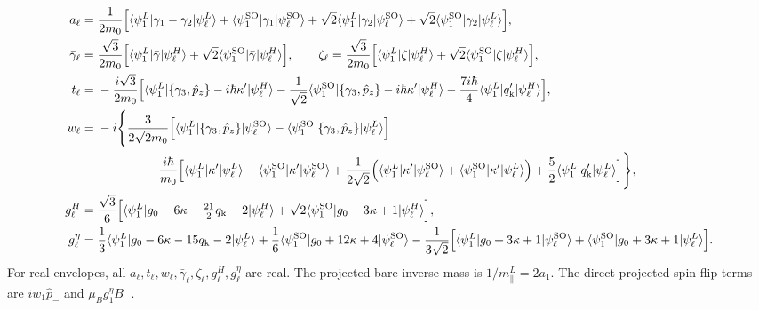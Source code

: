\begin{align}
 a_\ell={}&\frac{1}{2m_0}\Bigl[
 \langle \psi_1^L\vert \gamma_1-\gamma_2\vert \psi_\ell^L\rangle
 +\langle \psi_1^{\mathrm{SO}}\vert \gamma_1\vert \psi_\ell^{\mathrm{SO}}\rangle
 +\sqrt2\langle \psi_1^L\vert \gamma_2\vert \psi_\ell^{\mathrm{SO}}\rangle
 +\sqrt2\langle \psi_1^{\mathrm{SO}}\vert \gamma_2\vert \psi_\ell^L\rangle
 \Bigr],\label{eq:swt6-a}\\
 \bar\gamma_\ell={}&\frac{\sqrt3}{2m_0}\Bigl[
 \langle \psi_1^L\vert \bar\gamma\vert \psi_\ell^H\rangle
 +\sqrt2\langle \psi_1^{\mathrm{SO}}\vert \bar\gamma\vert \psi_\ell^H\rangle
 \Bigr],\qquad
 \zeta_\ell=\frac{\sqrt3}{2m_0}\Bigl[
 \langle \psi_1^L\vert \zeta\vert \psi_\ell^H\rangle
 +\sqrt2\langle \psi_1^{\mathrm{SO}}\vert \zeta\vert \psi_\ell^H\rangle
 \Bigr],\label{eq:swt6-R}\\
 t_\ell={}&-\frac{i\sqrt3}{2m_0}\Bigl[
 \langle \psi_1^L\vert \{\gamma_3, \hat{p}_ z\}-i\hbar\kappa'\vert \psi_\ell^H\rangle
 -\frac{1}{\sqrt2}
 \langle \psi_1^{\mathrm{SO}}\vert \{\gamma_3, \hat{p}_ z\}-i\hbar\kappa'\vert \psi_\ell^H\rangle
 -\frac{7i\hbar}{4}\langle \psi_1^L\vert q_{\mathrm k}'\vert \psi_\ell^H\rangle
 \Bigr],\label{eq:swt6-t}\\
 w_\ell={}&-i\Bigg\{
 \frac{3}{2\sqrt2m_0}\Bigl[
 \langle \psi_1^L\vert \{\gamma_3, \hat{p}_ z\}\vert \psi_\ell^{\mathrm{SO}}\rangle
 -\langle \psi_1^{\mathrm{SO}}\vert \{\gamma_3, \hat{p}_ z\}\vert \psi_\ell^L\rangle
 \Bigr]\nonumber\\
 &\hspace{1.3cm}-\frac{i\hbar}{m_0}\Bigl[
 \langle \psi_1^L\vert \kappa'\vert \psi_\ell^L\rangle
 -\langle \psi_1^{\mathrm{SO}}\vert \kappa'\vert \psi_\ell^{\mathrm{SO}}\rangle
 +\frac{1}{2\sqrt2}\Bigl(
 \langle \psi_1^L\vert \kappa'\vert \psi_\ell^{\mathrm{SO}}\rangle
 +\langle \psi_1^{\mathrm{SO}}\vert \kappa'\vert \psi_\ell^L\rangle\Bigr)
 +\frac52\langle \psi_1^L\vert q_{\mathrm k}'\vert \psi_\ell^L\rangle
 \Bigr]\Bigg\},\label{eq:swt6-w}\\
 g_\ell^H={}&\frac{\sqrt3}{6}\Bigl[
 \langle \psi_1^L\vert g_0-6\kappa-\tfrac{21}{2}q_{\mathrm k}-2\vert \psi_\ell^H\rangle
 +\sqrt2\langle \psi_1^{\mathrm{SO}}\vert g_0+3\kappa+1\vert \psi_\ell^H\rangle
 \Bigr],\label{eq:swt6-gH}\\
 g_\ell^\eta={}&
 \frac13\langle \psi_1^L\vert g_0-6\kappa-15q_{\mathrm k}-2\vert \psi_\ell^L\rangle
 +\frac16\langle \psi_1^{\mathrm{SO}}\vert g_0+12\kappa+4\vert \psi_\ell^{\mathrm{SO}}\rangle
 -\frac{1}{3\sqrt2}\Bigl[
 \langle \psi_1^L\vert g_0+3\kappa+1\vert \psi_\ell^{\mathrm{SO}}\rangle
 +\langle \psi_1^{\mathrm{SO}}\vert g_0+3\kappa+1\vert \psi_\ell^L\rangle
 \Bigr].\label{eq:swt6-geta}
\end{align}
For real envelopes, all $a_\ell,t_\ell,w_\ell,\bar\gamma_\ell,
\zeta_\ell,g_\ell^H,g_\ell^\eta$ are real. The projected bare
inverse mass is $1/m_\parallel^L=2a_1$. The direct projected
spin-flip terms are $iw_1 \hat{p}_ -$ and $\mu_B g_1^\eta B_-$.

